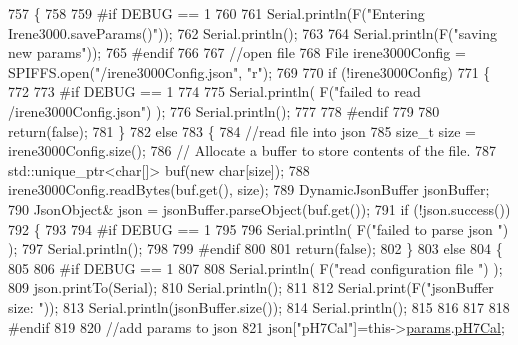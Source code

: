 \begin{DoxyCode}
757 \{
758 
759 \textcolor{preprocessor}{#if DEBUG == 1}
760         
761     Serial.println(F(\textcolor{stringliteral}{"Entering Irene3000.saveParams()"}));
762     Serial.println();
763     
764     Serial.println(F(\textcolor{stringliteral}{"saving new params"}));
765 \textcolor{preprocessor}{#endif}
766     
767     \textcolor{comment}{//open file}
768     File irene3000Config = SPIFFS.open(\textcolor{stringliteral}{"/irene3000Config.json"}, \textcolor{stringliteral}{"r"});
769 
770     \textcolor{keywordflow}{if} (!irene3000Config) 
771     \{
772     
773 \textcolor{preprocessor}{    #if DEBUG == 1 }
774 
775         Serial.println( F(\textcolor{stringliteral}{"failed to read /irene3000Config.json"}) );
776         Serial.println();
777     
778 \textcolor{preprocessor}{    #endif}
779 
780         \textcolor{keywordflow}{return}(\textcolor{keyword}{false});
781     \}
782     \textcolor{keywordflow}{else}
783     \{
784         \textcolor{comment}{//read file into json}
785         \textcolor{keywordtype}{size\_t} size = irene3000Config.size();
786         \textcolor{comment}{// Allocate a buffer to store contents of the file.}
787         std::unique\_ptr<char[]> buf(\textcolor{keyword}{new} \textcolor{keywordtype}{char}[size]);
788             irene3000Config.readBytes(buf.get(), size);
789         DynamicJsonBuffer jsonBuffer;
790         JsonObject& json = jsonBuffer.parseObject(buf.get());
791         \textcolor{keywordflow}{if} (!json.success()) 
792         \{
793         
794 \textcolor{preprocessor}{        #if DEBUG == 1 }
795 
796             Serial.println( F(\textcolor{stringliteral}{"failed to parse json "}) );
797             Serial.println();
798         
799 \textcolor{preprocessor}{        #endif}
800             
801             \textcolor{keywordflow}{return}(\textcolor{keyword}{false});
802         \} 
803         \textcolor{keywordflow}{else}
804         \{
805         
806 \textcolor{preprocessor}{        #if DEBUG == 1 }
807     
808             Serial.println( F(\textcolor{stringliteral}{"read configuration file "}) );
809             json.printTo(Serial);
810             Serial.println();
811 
812             Serial.print(F(\textcolor{stringliteral}{"jsonBuffer size: "}));
813             Serial.println(jsonBuffer.size());
814             Serial.println();
815 
816         
817 
818 \textcolor{preprocessor}{        #endif          }
819     
820             \textcolor{comment}{//add params to json}
821             json[\textcolor{stringliteral}{"pH7Cal"}]=this->\hyperlink{class_irene3000_a136585a5ee7f9ac6ab52175fa153f8e3}{params}.\hyperlink{struct_irene3000_1_1parameters___t_a21265466a570d84bff914f26d2f7a03e}{pH7Cal};

\end{DoxyCode}
